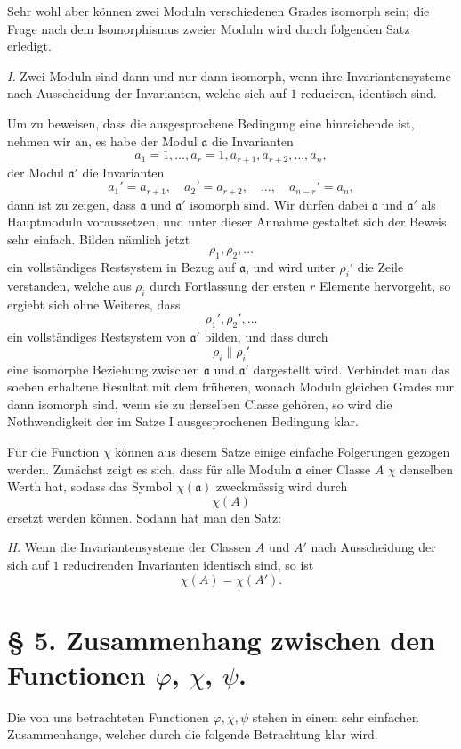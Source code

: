 Sehr wohl aber können zwei Moduln verschiedenen Grades isomorph sein; die Frage nach dem Isomorphismus zweier Moduln wird durch folgenden Satz erledigt.

\emph{I.} Zwei Moduln sind dann und nur dann isomorph, wenn ihre Invariantensysteme nach Ausscheidung der Invarianten, welche sich auf $1$ reduciren, identisch sind.

Um zu beweisen, dass die ausgesprochene Bedingung eine hinreichende ist, nehmen wir an, es habe der Modul $\mathfrak a$ die Invarianten
\[
 a_1=1,\ldots,a_r=1,a_{r+1},a_{r+2},\ldots,a_n,
\]
der Modul $\mathfrak a'$ die Invarianten
\[
 a_1'=a_{r+1},\quad a_2'=a_{r+2},\quad\ldots,\quad a_{n-r}'=a_n,
\]
dann ist zu zeigen, dass $\mathfrak a$ und $\mathfrak a'$ isomorph sind. Wir dürfen dabei $\mathfrak a$ und $\mathfrak a'$ als Hauptmoduln voraussetzen, und unter dieser Annahme gestaltet sich der Beweis sehr einfach. Bilden nämlich jetzt
\[
 \rho_1,\rho_2,\ldots
\]
ein vollständiges Restsystem in Bezug auf $\mathfrak a$, und wird unter $\rho_i'$ die Zeile verstanden, welche aus $\rho_i$ durch Fortlassung der ersten $r$ Elemente hervorgeht, so ergiebt sich ohne Weiteres, dass
\[
 \rho_1',\rho_2',\ldots
\]
ein vollständiges Restsystem von $\mathfrak a'$ bilden, und dass durch
\[
 \rho_i\parallel\rho_i'
\]
eine isomorphe Beziehung zwischen $\mathfrak a$ und $\mathfrak a'$ dargestellt wird. Verbindet man das soeben erhaltene Resultat mit dem früheren, wonach Moduln gleichen Grades nur dann isomorph sind, wenn sie zu derselben Classe gehören, so wird die Nothwendigkeit der im Satze I ausgesprochenen Bedingung klar.

Für die Function $\chi$ können aus diesem Satze einige einfache Folgerungen gezogen werden. Zunächst zeigt es sich, dass für alle Moduln $\mathfrak a$ einer Classe $A$ $\chi$ denselben Werth hat, sodass das Symbol $\chi(\mathfrak a)$ zweckmässig wird durch
\[
 \chi(A)
\]
ersetzt werden können. Sodann hat man den Satz:

\emph{II.} Wenn die Invariantensysteme der Classen $A$ und $A'$ nach Ausscheidung der sich auf $1$ reducirenden Invarianten identisch sind, so ist
\[
 \chi(A)=\chi(A').
\]

\section*{§ 5. Zusammenhang zwischen den Functionen $\varphi$, $\chi$, $\psi$.}

Die von uns betrachteten Functionen $\varphi,\chi,\psi$ stehen in einem sehr einfachen Zusammenhange, welcher durch die folgende Betrachtung klar wird.

